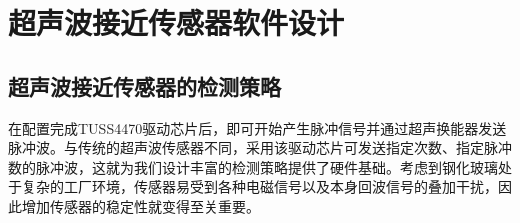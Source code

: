     \newpage
	\section{超声波接近传感器软件设计}
    \subsection{超声波接近传感器的检测策略}
      在配置完成TUSS4470驱动芯片后，即可开始产生脉冲信号并通过超声换能器发送脉冲波。与传统的超声波传感器不同，采用该驱动芯片可发送指定次数、指定脉冲数的脉冲波，这就为我们设计丰富的检测策略提供了硬件基础。考虑到钢化玻璃处于复杂的工厂环境，传感器易受到各种电磁信号以及本身回波信号的叠加干扰，因此增加传感器的稳定性就变得至关重要。\par
      
